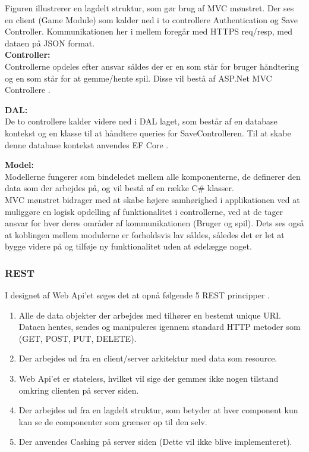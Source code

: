 \noindent Figuren illustrerer en lagdelt struktur, som gør brug af MVC mønstret. Der ses en client (Game Module) som kalder ned i to controllere Authentication og Save Controller. Kommunikationen her i mellem foregår med HTTPS req/resp, med dataen på JSON format.\\

\noindent \textbf{Controller:}\\
Controllerne opdeles efter ansvar såldes der er en som står for bruger håndtering og en som står for at gemme/hente spil. Disse vil bestå af ASP.Net MVC Controllere \cite{MVC controller}.

\noindent \textbf{DAL:}\\
De to controllere kalder videre ned i DAL laget, som består af en database kontekst og en klasse til at håndtere queries for SaveControlleren. Til at skabe denne database kontekst anvendes EF Core \cite{EF Core}.

\noindent \textbf{Model:}\\
Modellerne fungerer som bindeledet mellem alle komponenterne, de definerer den data som der arbejdes på, og vil bestå af en række C\# klasser.\\

\noindent MVC mønstret bidrager med at skabe højere samhørighed i applikationen ved at muliggøre en logisk opdelling af funktionalitet i controllerne, ved at de tager ansvar for hver deres områder af kommunikationen (Bruger og spil). Dets ses også at koblingen mellem modulerne er forholdsvis lav såldes, således det er let at bygge videre på og tilføje ny funktionalitet uden at ødelægge noget.\\

\subsubsection{REST}
I designet af Web Api'et søges det at opnå følgende 5 REST principper \cite{REST}.

\begin{enumerate}
 \item Alle de data objekter der arbejdes med tilhører en bestemt unique URI. Dataen hentes, sendes og manipuleres igennem standard HTTP metoder som (GET, POST, PUT, DELETE).
 \item Der arbejdes ud fra en client/server arkitektur med data som resource. 
 \item Web Api’et er stateless, hvilket vil sige der gemmes ikke nogen tilstand omkring clienten på server siden.
 \item Der arbejdes ud fra en lagdelt struktur, som betyder at hver component kun kan se de componenter som grænser op til den selv.
 \item Der anvendes Cashing på server siden (Dette vil ikke blive implementeret).
\end{enumerate}

